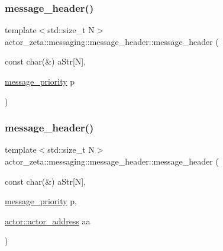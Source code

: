 \subsubsection{\texorpdfstring{message\+\_\+header()}{message\_header()}\hspace{0.1cm}{\footnotesize\ttfamily [6/11]}}
{\footnotesize\ttfamily template$<$std\+::size\+\_\+t N$>$ \\
actor\+\_\+zeta\+::messaging\+::message\+\_\+header\+::message\+\_\+header (\begin{DoxyParamCaption}\item[{const char(\&)}]{a\+Str\mbox{[}\+N\mbox{]},  }\item[{\hyperlink{namespaceactor__zeta_1_1messaging_a1b4c4b3ab625eb033c15da4fbe9c4a89}{message\+\_\+priority}}]{p }\end{DoxyParamCaption})\hspace{0.3cm}{\ttfamily [inline]}}

\mbox{\label{classactor__zeta_1_1messaging_1_1message__header_a3054631c5d8fd5ce9a41601c4f0810f0}} 
\subsubsection{\texorpdfstring{message\+\_\+header()}{message\_header()}\hspace{0.1cm}{\footnotesize\ttfamily [7/11]}}
{\footnotesize\ttfamily template$<$std\+::size\+\_\+t N$>$ \\
actor\+\_\+zeta\+::messaging\+::message\+\_\+header\+::message\+\_\+header (\begin{DoxyParamCaption}\item[{const char(\&)}]{a\+Str\mbox{[}\+N\mbox{]},  }\item[{\hyperlink{namespaceactor__zeta_1_1messaging_a1b4c4b3ab625eb033c15da4fbe9c4a89}{message\+\_\+priority}}]{p,  }\item[{\hyperlink{classactor__zeta_1_1actor_1_1actor__address}{actor\+::actor\+\_\+address}}]{aa }\end{DoxyParamCaption})\hspace{0.3cm}{\ttfamily [inline]}}

